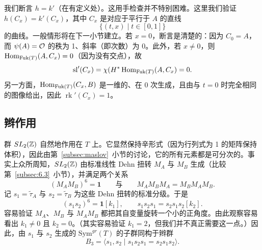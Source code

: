 
我们断言 $h=k'$（在有定义处）。这用手检查并不特别困难。这里我们验证 $h(C_x)=k'(C_x)$，其中 $C_x$ 是对应于平行于 $A$ 的直线
\[
\{(t,x)\mid t\in[0,1]\}
\]
的曲线。一般情形将在下一小节建立。若 $x=0$，断言是清楚的：因为 $C_0=A$，而 $\psi(A)=\mathcal{O}$ 的秩为 1、斜率（即次数）为 0。此外，若 $x\ne 0$，则 $\operatorname{Hom}_{\operatorname{Fuk}(T)}(A,C_x)=0$（因为没有交点），故
\[
\operatorname{sl}'(C_x)=\chi(H^*\operatorname{Hom}_{\operatorname{Fuk}(T)}(A,C_x)=0.
\]
另一方面，$\operatorname{Hom}_{\operatorname{Fuk}(T)}(C_x,B)$ 是一维的、在 $0$ 次生成，且由与 $t=0$ 时完全相同的图像给出，因此 $\operatorname{rk}'(C_x)=1$。


\subsection{辫作用}
\label{subsec:braid}

群 $SL_2(\mathbb{Z})$ 自然地作用在 $T$ 上。它显然保持辛形式（因为行列式为 1 的矩阵保持体积），因此由第~\ref{subsec:maslov}~小节的讨论，它的所有元素都是可分次的。事实上众所周知，$SL_2(\mathbb{Z})$ 由标准线性 Dehn 扭转 $M_A$ 与 $M_B$ 生成（比较第~\ref{subsec:6.3}~小节），并满足两个关系
\[
(M_AM_B)^6=\mathbf{1}
\qquad\text{与}\qquad
M_AM_BM_A=M_BM_AM_B.
\]
记 $s_1=\tilde{\tau}_A$ 与 $s_2=\tilde{\tau}_B$ 为这些 Dehn 扭转的标准分级。于是
\[
(s_1s_2)^6=\mathbf{1}[k_1],
\qquad
s_1s_2s_1=s_2s_1s_2[k_2].
\]
容易验证 $M_A$、$M_B$ 与 $M_AM_B$ 都把其自变量旋转一个小的正角度。由此观察容易看出 $k_1\ne 0$ 且 $k_2=0$。（其实容易验证 $k_1=2$，但我们并不真正需要这一点。）因此，由 $s_1$ 与 $s_2$ 生成的 $\mathrm{Sym}^{gr}(T)$ 的子群同构于辫群
\[
B_3=\langle s_1,s_2\mid s_1s_2s_1=s_2s_1s_2\rangle.
\]


